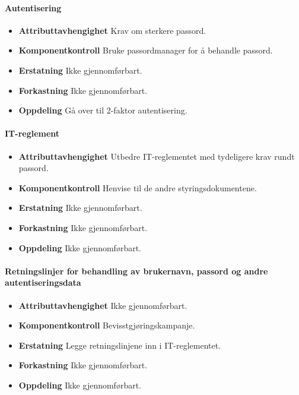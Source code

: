 \paragraph{Autentisering}
\begin{itemize}
    \item \textbf{Attributtavhengighet} Krav om sterkere passord.
    \item \textbf{Komponentkontroll} Bruke passordmanager for å behandle passord. 
    \item \textbf{Erstatning} Ikke gjennomførbart.
    \item \textbf{Forkastning} Ikke gjennomførbart.
    \item \textbf{Oppdeling} Gå over til 2-faktor autentisering.
\end{itemize}

\paragraph{IT-reglement}
\begin{itemize}
    \item \textbf{Attributtavhengighet} Utbedre IT-reglementet med tydeligere krav rundt passord. 
    \item \textbf{Komponentkontroll} Henvise til de andre styringsdokumentene.
    \item \textbf{Erstatning} Ikke gjennomførbart.
    \item \textbf{Forkastning} Ikke gjennomførbart.
    \item \textbf{Oppdeling} Ikke gjennomførbart.
\end{itemize}

\paragraph{Retningslinjer for behandling av brukernavn, passord og andre autentiseringsdata}
\begin{itemize}
    \item \textbf{Attributtavhengighet} Ikke gjennomførbart.
    \item \textbf{Komponentkontroll} Bevisstgjøringskampanje.
    \item \textbf{Erstatning} Legge retningslinjene inn i IT-reglementet.
    \item \textbf{Forkastning} Ikke gjennomførbart.
    \item \textbf{Oppdeling} Ikke gjennomførbart.
\end{itemize}

